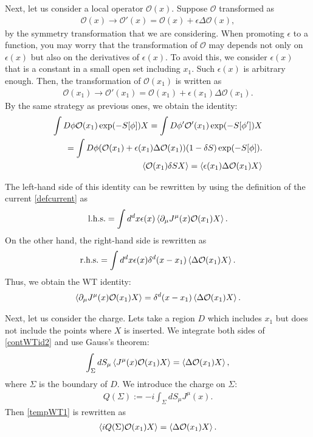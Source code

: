 \documentclass[12pt]{scrartcl}
\newcommand{\del}{\partial}
\newcommand{\Ocal}{\mathcal{O}}
\begin{document}
Next, let us consider a local operator $\Ocal(x)$.  Suppose $\Ocal$ transformed as
\begin{align}
    \Ocal(x)\to \Ocal'(x)=\Ocal(x)+\epsilon \Delta \Ocal(x),
\end{align}
by the symmetry transformation that we are considering.  When promoting $\epsilon$ to a function, you may worry that the transformation of $\Ocal$ may depends not only on $\epsilon(x)$ but also on the derivatives of $\epsilon(x)$.  To avoid this, we consider $\epsilon(x)$ that is a constant in a small open set including $x_1$.  Such $\epsilon(x)$ is arbitrary enough.  Then, the transformation of $\Ocal(x_1)$ is written as
\begin{align}
    \Ocal(x_1)\to \Ocal'(x_1)=\Ocal(x_1)+\epsilon(x_1) \Delta \Ocal(x_1).
\end{align}
By the same strategy as previous ones, we obtain the identity:
\begin{align}
    \int D\phi \Ocal(x_1)\exp(-S[\phi])X
    =\int D\phi' \Ocal'(x_1)\exp(-S[\phi'])X\nonumber\\
    =\int D\phi (\Ocal(x_1)+\epsilon(x_1)\Delta \Ocal(x_1))(1-\delta S)\exp(-S[\phi]).\nonumber\\
    \expval{\Ocal(x_1)\delta S X}
    =\expval{\epsilon(x_1)\Delta \Ocal(x_1)X} \label{tempWT0}
\end{align}


The left-hand side of this identity can be rewritten by using the definition of the current \eqref{defcurrent} as
\begin{align}
    \mathrm{l.h.s.}=\int d^dx \epsilon(x)\expval{\del_{\mu}J^{\mu}(x)\Ocal(x_1)X}.
\end{align}
On the other hand, the right-hand side is rewritten as
\begin{align}
    \mathrm{r.h.s.}=\int d^dx \epsilon(x)\delta^d(x-x_1)\expval{\Delta \Ocal(x_1)X}.
\end{align}
Thus, we obtain the WT identity:
\begin{align}
    \expval{\del_{\mu}J^{\mu}(x) \Ocal(x_1)X}=\delta^d(x-x_1)\expval{\Delta \Ocal(x_1)X}.
    \label{contWTid2}
\end{align}

Next, let us consider the charge.  Lets take a region $D$ which includes $x_1$ but does not include the points where $X$ is inserted. We integrate both sides of \eqref{contWTid2} and use Gauss's theorem:
\begin{align}
    \int_{\Sigma}dS_{\mu}\expval{J^{\mu}(x)\Ocal(x_1)X}=\expval{\Delta \Ocal(x_1)X},\label{tempWT1}
\end{align}
where $\Sigma$ is the boundary of $D$.  We introduce the charge on $\Sigma$:
\begin{align}
    Q(\Sigma):=-i\int_{\Sigma}dS_{\mu} J^{\mu}(x).
\end{align}
Then \eqref{tempWT1} is rewritten as
\begin{align}
    \expval{iQ(\Sigma)\Ocal(x_1)X}=
    \expval{\Delta \Ocal(x_1)X}.
    \label{tempWT2}
\end{align}
\end{document}
